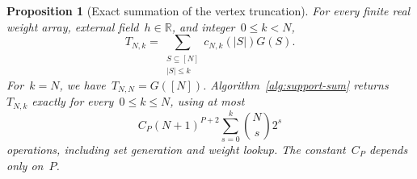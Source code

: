 \documentclass[letterpaper,11pt,reqno]{amsart}
\renewcommand{\leq}{\leqslant}
\newtheorem{proposition}[theorem]{Proposition}
\begin{document}
\begin{proposition}[Exact summation of the vertex truncation]\label{prop:pure-evaluation}
For every finite real weight array, external field~$h\in\mathbb R$, and integer~$0\leq k<N$,
\begin{equation}\label{eq:pure-exact-support}
T_{N,k}=\sum_{\substack{S\subseteq[N]\\|S|\leq k}}c_{N,k}(|S|)G(S).
\end{equation}
For~$k=N$, we have~$T_{N,N}=G([N])$. Algorithm~\ref{alg:support-sum} returns~$T_{N,k}$ exactly for every~$0\leq k\leq N$, using at most
\begin{equation}\label{eq:pure-evaluation-cost}
C_P(N+1)^{P+2}\sum_{s=0}^{k}\binom Ns2^s
\end{equation}
operations, including set generation and weight lookup. The constant~$C_P$ depends only on~$P$.
\end{proposition}
\end{document}
